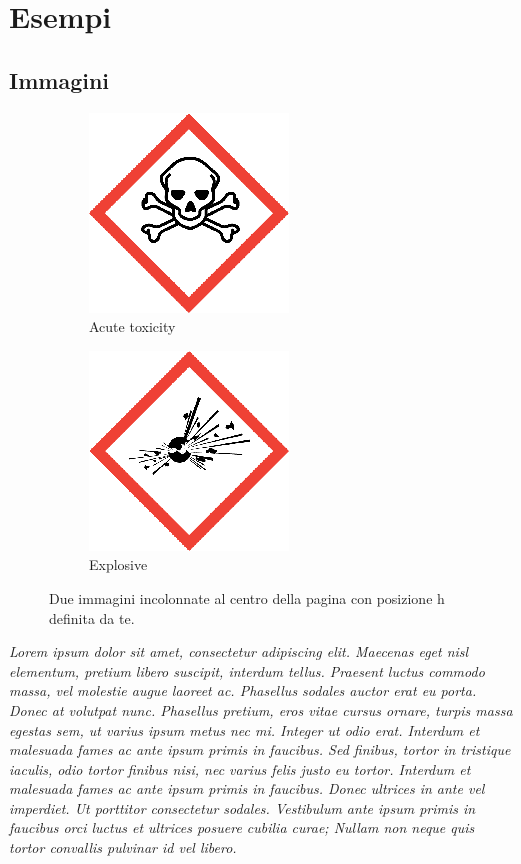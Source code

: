 \section*{Esempi}
\subsection*{Immagini}

\begin{figure}[h]
    \centering
    \begin{subfigure}[]{0.5\linewidth}
    \centering
    \includegraphics[scale=0.2]{img/pittogrammi/Acute toxicity.png}
    \caption{Acute toxicity}
    \end{subfigure}
    \begin{subfigure}[]{0.5\linewidth}
    \centering
    \includegraphics[scale=0.2]{img/pittogrammi/Explosive.png}
    \caption{Explosive}
    \end{subfigure}
    \caption{Due immagini incolonnate al centro della pagina con posizione h definita da te.}
    \label{fig:1}
\end{figure}

\textit{Lorem ipsum dolor sit amet, consectetur adipiscing elit. Maecenas eget nisl elementum, pretium libero suscipit, interdum tellus. Praesent luctus commodo massa, vel molestie augue laoreet ac. Phasellus sodales auctor erat eu porta. Donec at volutpat nunc. Phasellus pretium, eros vitae cursus ornare, turpis massa egestas sem, ut varius ipsum metus nec mi. Integer ut odio erat. Interdum et malesuada fames ac ante ipsum primis in faucibus. Sed finibus, tortor in tristique iaculis, odio tortor finibus nisi, nec varius felis justo eu tortor. Interdum et malesuada fames ac ante ipsum primis in faucibus. Donec ultrices in ante vel imperdiet. Ut porttitor consectetur sodales. Vestibulum ante ipsum primis in faucibus orci luctus et ultrices posuere cubilia curae; Nullam non neque quis tortor convallis pulvinar id vel libero.}

